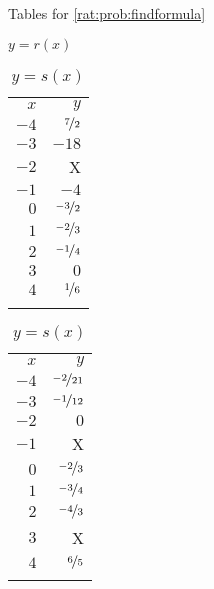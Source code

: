 \begin{exercises}
\begin{problem}
\begin{table}[!htb]
	\begin{widepage}
	\centering
	\caption{Tables for \cref{rat:prob:findformula}}
	\label{rat:tab:findformula}
	\begin{subtable}{.2\textwidth}
		\centering
		\caption{$y=r(x)$}
		\label{rat:tab:findformular}
		\begin{tabular}{rr}
			\beforeheading
			$x$  & $y$                \\ \afterheading
			$-4$ & $\nicefrac{7}{2}$  \\\normalline
			$-3$ & $-18$              \\\normalline
			$-2$ & X                  \\\normalline
			$-1$ & $-4$               \\\normalline
			$0$  & $\nicefrac{-3}{2}$ \\\normalline
			$1$  & $\nicefrac{-2}{3}$ \\\normalline
			$2$  & $\nicefrac{-1}{4}$ \\\normalline
			$3$  & $0$                \\\normalline
			$4$  & $\nicefrac{1}{6}$  \\\lastline
		\end{tabular}
	\end{subtable}
	\hfill
	\begin{subtable}{.2\textwidth}
		\centering
		\caption{$y=s(x)$}
		\label{rat:tab:findformulas}
		\begin{tabular}{rr}
			\beforeheading
			$x$  & $y$                 \\ \afterheading
			$-4$ & $\nicefrac{-2}{21}$ \\\normalline
			$-3$ & $\nicefrac{-1}{12}$ \\\normalline
			$-2$ & $0$                 \\\normalline
			$-1$ & X                   \\\normalline
			$0$  & $\nicefrac{-2}{3}$  \\\normalline
			$1$  & $\nicefrac{-3}{4}$  \\\normalline
			$2$  & $\nicefrac{-4}{3}$  \\\normalline
			$3$  & X                   \\\normalline
			$4$  & $\nicefrac{6}{5}$   \\\lastline
		\end{tabular}
	\end{subtable}
	\hfill
	\begin{subtable}{.2\textwidth}

\end{subtable}
\end{widepage}
\end{table}
\end{problem}
\end{exercises}
